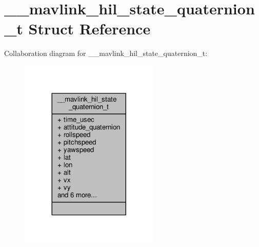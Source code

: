 \hypertarget{struct____mavlink__hil__state__quaternion__t}{\section{\+\_\+\+\_\+mavlink\+\_\+hil\+\_\+state\+\_\+quaternion\+\_\+t Struct Reference}
\label{struct____mavlink__hil__state__quaternion__t}
}


Collaboration diagram for \+\_\+\+\_\+mavlink\+\_\+hil\+\_\+state\+\_\+quaternion\+\_\+t\+:
\nopagebreak
\begin{figure}[H]
\begin{center}
\leavevmode
\includegraphics[width=188pt]{struct____mavlink__hil__state__quaternion__t__coll__graph}
\end{center}
\end{figure}
